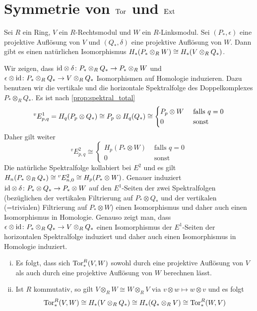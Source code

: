 \section[Symmetrie von Tor und Ext]{Symmetrie von $\operatorname{Tor}$ und $\operatorname{Ext}$} %
\label{sec:18}

\begin{satz}[label=satz:symmetrie_tor,{name=[{Homologie von Auflösungen der Faktoren des Tensorproduktes}]}]
	Sei $R$ ein Ring, $V$ ein $R$-Rechtsmodul und $W$ ein $R$-Linksmodul.
	Sei $(P_*,\epsilon)$ eine projektive Auflösung von $V$ und $(Q_*,\delta)$ eine projektive Auflösung von $W$.
	Dann gibt es einen natürlichen Isomorphismus $H_* \enbrace*{P_* \otimes_R W} \cong H_* \enbrace*{V \otimes_R Q_*}$.
\end{satz}
\begin{beweis}
	Wir zeigen, dass ${\operatorname{id}} \otimes \delta \colon P_* \otimes_R Q_* \to P_* \otimes_R W$ und $\epsilon \otimes \operatorname{id} \colon P_* \otimes_R Q_* \to V \otimes_R Q_*$ Isomorphismen auf Homologie induzieren.
	Dazu benutzen wir die vertikale und die horizontale Spektralfolge des Doppelkomplexes $P_* \otimes_R Q_*$.
	Es ist nach \autoref{prop:spektral_total}
	\[
		^v E^1_{p,q} = H_q \enbrace*{P_p \otimes Q_*} \cong P_p \otimes H_q(Q_*) \cong \begin{cases}
			P_p \otimes W &\text{ falls }q=0\\
			0 &\text{ sonst }
		\end{cases}
	\]
	Daher gilt weiter
	\[
		^v E^2_{p,q}\cong \begin{cases}
			H_p(P_*\otimes W) &\text{ falls }q=0\\
			0 &\text{ sonst }
		\end{cases}
	\]
	Die natürliche Spektralfolge kollabiert bei $E^2$ und es gilt $H_n \enbrace*{P_* \otimes_R Q_*} \cong {^v E^2_{n,0}} \cong H_p (P_* \otimes W)$.
	Genauer induziert ${\operatorname{id}} \otimes \delta \colon P_* \otimes Q_* \to P_* \otimes W$ auf den $E^1$-Seiten der zwei Spektralfolgen (bezüglichen der vertikalen Filtrierung auf $P_* \otimes Q_*$ und der vertikalen (=trivialen) Filtrierung auf $P_* \otimes W$) einen Isomorphismus und daher auch einen Isomorphismus in Homologie.
	Genauso zeigt man, dass $\epsilon \otimes \operatorname{id} \colon P_* \otimes_R Q_* \to V \otimes_R Q_*$ einen Isomorphismus der $E^1$-Seiten der horizontalen Spektralfolge induziert und daher auch einen Isomorphismus in Homologie induziert.
\end{beweis}

\begin{bemerkung}[{name=[{Symmetrie von Tor}]}]
	\leavevmode
	\begin{enumerate}[(i)]
		\item Es folgt, dass sich $\operatorname{Tor}_*^R(V,W)$ sowohl durch eine projektive Auflösung von $V$ als auch durch eine projektive Auflösung von $W$ berechnen lässt.
		\item Ist $R$ kommutativ, so gilt $V \otimes_R W \cong W \otimes_R V$ via $v \otimes w \mapsto w \otimes v$ und es folgt
		\[
			\Tor_*^R(V,W) \cong H_*\enbrace*{V \otimes_R Q_*} \cong H_* \enbrace*{Q_* \otimes_R V} \cong \Tor_*^R(W,V)
		\]
	\end{enumerate}
\end{bemerkung}

